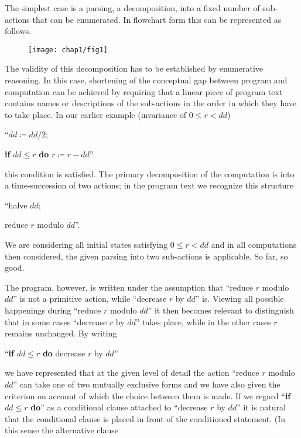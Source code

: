 The simplest case is a parsing, a decomposition, into a fixed number of sub-actions that can be enumerated. In flowchart form this can be represented as follows. 

\begin{figure}[ht!]
	\centering
	\texttt{[image: chap1/fig1]}
\end{figure}

The validity of this decomposition has to be established by enumerative reasoning. In this case, shortening of the conceptual gap between program and computation can be achieved by requiring that a linear piece of program text contains names or descriptions of the sub-actions in the order in which they have to take place. In our earlier example (invariance of $0 \leqslant r < dd$)
\medskip

{
	\setlength{\parindent}{8em}
	\hspace{-.4em}``$dd \coloneq dd/2;$
	
	\textbf{if} $dd \leqslant r$ \textbf{do} $r \coloneq r - dd$''
}
\medskip

\noindent
this condition is satisfied. The primary decomposition of the computation is into a time-succession of two actions; in the program text we recognize this structure
\medskip

{
	\setlength{\parindent}{8em}
	\hspace{-.4em}``halve $dd;$
	
	reduce $r$ modulo $dd$''.
}
\medskip

We are considering all initial states satisfying $0 \leqslant r < dd$ and in all computations then considered, the given parsing into two sub-actions is applicable. So far, so good.

The program, however, is written under the assumption that ``reduce $r$ modulo $dd$'' is not a primitive action, while ``decrease $r$ by $dd$'' is. Viewing all possible happenings during ``reduce $r$ modulo $dd$'' it then becomes relevant to distinguish that in some cases ``decrease $r$ by $dd$'' takes place, while in the other cases $r$ remains unchanged. By writing
\medskip

{
	\setlength{\parindent}{8em}
	\hspace{-.4em}``\textbf{if} $dd \leqslant r$ \textbf{do} decrease $r$ by $dd$''
}
\medskip

\noindent
we have represented that at the given level of detail the action ``reduce $r$ modulo $dd$'' can take one of two mutually exclusive forms and we have also given the criterion on account of which the choice between them is made. If we regard ``\textbf{if} $dd \leqslant r$ \textbf{do}'' as a conditional clause attached to ``decrease $r$ by $dd$'' it is natural that the conditional clause is placed in front of the conditioned statement. (In this sense the alternative clause
\medskip

